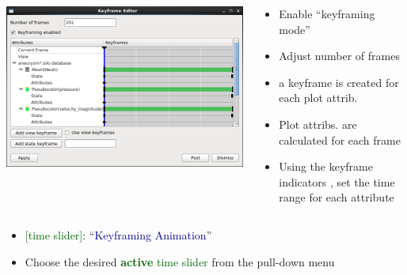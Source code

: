 \begin{frame}
\begin{columns}[T]
\begin{column}{5.35cm}
	\includegraphics[width=\columnwidth]{figs/visit-guis/visit_keyframes}
\end{column}
\begin{column}{6.5cm}
	\vspace{-2mm}
	\pause
	\begin{itemize}
	\item[\ding{224}] Enable ``keyframing mode''
	\item[\ding{224}] Adjust number of frames
	\item a keyframe is created for each plot attrib.
	\pause
	\item Plot attribs. are calculated for each frame
	\item[\ding{224}] Using the keyframe indicators {\tiny {}}, set the time range for each attribute
	\end{itemize}
\end{column}
\end{columns}
\begin{itemize}
	\pause
	\item[\ding{224}] \textcolor{DarkGreen}{[time slider]}: ``\textcolor{DarkBlue}{Keyframing Animation}''
	\item[\ding{224}] Choose the desired \textcolor{DarkGreen}{\textbf{active} time slider} from the pull-down menu
\end{itemize}
\end{frame}

\resetEnv
